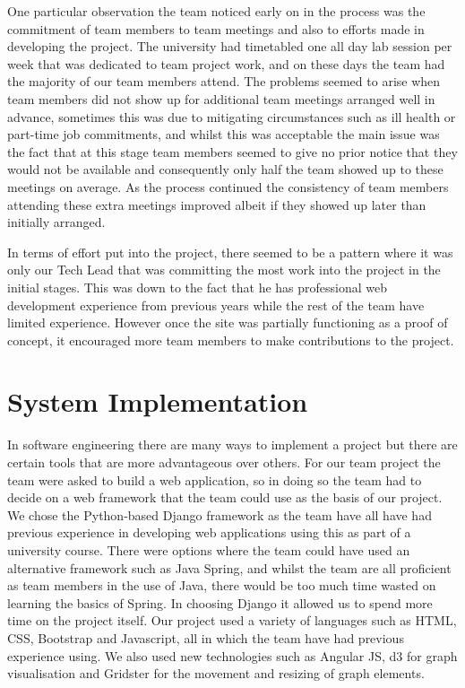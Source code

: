\documentclass{l3proj}
\begin{document}
One particular observation the team noticed early on in the process was the commitment of team members to team meetings and also
to efforts made in developing the project. The university had timetabled one all day lab session per week that was dedicated
to team project work, and on these days the team had the majority of our team members attend. The problems seemed to arise when
team members did not show up for additional team meetings arranged well in advance, sometimes this was due to mitigating
circumstances such as ill health or part-time job commitments, and whilst this was acceptable the main issue was the fact
that at this stage team members seemed to give no prior notice that they would not be available and consequently only
half the team showed up to these meetings on average. As the process continued the consistency of team members attending these
extra meetings improved albeit if they showed up later than initially arranged.

In terms of effort put into the project, there seemed to be a pattern where it was only our Tech Lead that was committing the most
work into the project in the initial stages. This was down to the fact that he has professional web development experience from previous
years while the rest of the team have limited experience. However once the site was partially functioning as a proof of concept, it
encouraged more team members to make contributions to the project.




\section{System Implementation}
\label{sec:system-implementation}

In software engineering there are many ways to implement a project but there are certain tools that are more advantageous over
others. For our team project the team were asked to build a web application, so in doing so the team had to decide on a web framework that
the team could use as the basis of our project. We chose the Python-based Django framework as the team have all have had previous experience
in developing web applications using this as part of a university course. There were options where the team could have used an alternative
framework such as Java Spring, and whilst the team are all proficient as team members in the use of Java, there would be too much time
wasted on learning the basics of Spring. In choosing Django it allowed us to spend more time on the project itself. Our project
used a variety of languages such as HTML, CSS, Bootstrap and Javascript, all in which the team have had previous experience using.
We also used new technologies such as Angular JS, d3 for graph visualisation and Gridster for the movement and resizing of graph
elements.
\end{document}
